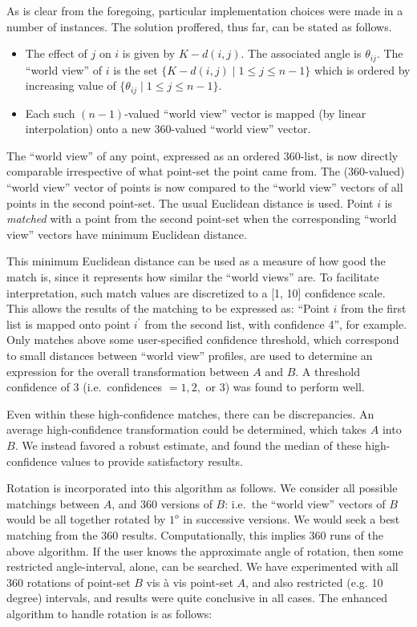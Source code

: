 As is clear from the foregoing, particular implementation choices were made
in a number of instances.  The solution proffered, thus far, 
can be stated as follows.

\begin{itemize}

\item The effect of $j$ on $i$ is given by $K - d(i,j)$.  The associated
angle is $\theta_{ij}$.  The ``world view'' of $i$ is the set
$\{ K - d(i,j) \mid 1 \leq j \leq n-1 \} $ which is ordered by increasing 
value of $\{ \theta_{ij} \mid 1 \leq j \leq n-1 \} $. 

\item Each such $(n-1)$-valued ``world view'' vector is mapped (by linear
interpolation) onto a new 360-valued ``world view'' vector.
\end{itemize}

The ``world view'' of any point, expressed as an ordered 360-list, is now
directly comparable irrespective of what point-set the point came from.
The (360-valued) ``world view'' vector of points is now compared to the 
``world view'' vectors of all points in the second point-set.  The 
usual Euclidean distance is used.  Point $i$ is {\it matched} with a
point from the second point-set when the corresponding ``world view'' 
vectors have minimum Euclidean distance.  

This minimum Euclidean distance
can be used as a measure of how good the match is, since it represents
how similar the ``world views'' are.  To facilitate interpretation, such
match values are discretized to a [1, 10] confidence scale.  This 
allows the results of the matching
to be expressed as: ``Point $i$ from the first list is
mapped onto point $i^{\prime}$ from the second list, with confidence 4'', for
example.  Only matches above some user-specified  confidence threshold, 
which correspond to small distances between
``world view'' profiles, are used to determine an expression for the 
overall transformation between $A$ and $B$.  A threshold confidence of 3 (i.e.\
confidences $= 1, 2,$ or $3$) was found to perform well.

Even within these high-confidence matches, there can be discrepancies.
An average high-confidence transformation could be determined, which takes 
$A$ into $B$.
We instead favored a robust estimate, and found the median of these
high-confidence values to provide satisfactory results.

Rotation is incorporated into this algorithm as follows.
We consider all possible
matchings between $A$, and 360 versions of $B$: 
i.e.\ the ``world view'' vectors
of $B$ would be all together rotated by $1^o$ in successive versions.  We 
would seek a best matching from the 360 results.
Computationally, this implies 360 runs of the above algorithm.  If the
user knows the approximate angle of rotation, then some restricted 
angle-interval, alone, can be searched.  We have experimented with all 360
rotations of point-set $B$ vis \`a vis point-set $A$, and also restricted
(e.g. 10 degree) intervals, and results were quite conclusive in all 
cases.  The enhanced algorithm to handle rotation is as follows:

